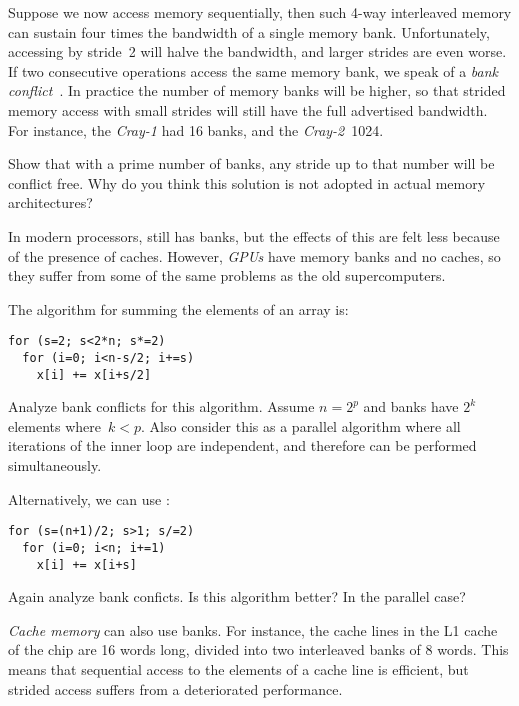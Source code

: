 Suppose we now access memory sequentially, then such 4-way interleaved
memory can sustain four times the bandwidth of a single memory
bank. Unfortunately, accessing by stride~2 will halve the bandwidth,
and larger strides are even worse.
%
If two consecutive operations
access the same memory bank, we speak of a
\emph{bank conflict}~\cite{Bailey:conflict}.
%
In practice the number of memory
banks will be higher, so that strided memory access with small strides
will still have the full advertised bandwidth. For instance, the
\emph{Cray-1} had 16 banks, and the
\emph{Cray-2}~1024.

\begin{exercise}
  Show that with a prime number of banks, any stride up to that number
  will be conflict free. Why do you think this solution is not adopted
  in actual memory architectures?
\end{exercise}

In modern processors,  still has banks, but the effects
of this are felt less because of the presence of caches. However,
\emph{GPUs}%
%
have memory banks and no caches,
so they suffer from some of the same problems as the old
supercomputers.

\begin{exercise}
  The  algorithm for summing the
  elements of an array is:
\begin{verbatim}
for (s=2; s<2*n; s*=2)
  for (i=0; i<n-s/2; i+=s)
    x[i] += x[i+s/2]
\end{verbatim}
  Analyze bank conflicts for this algorithm. Assume $n=2^p$ and banks
  have $2^k$ elements where~$k<p$. Also consider this as a parallel
  algorithm where all iterations of the inner loop are independent,
  and therefore can be performed
  simultaneously.

  Alternatively, we can use :
\begin{verbatim}
for (s=(n+1)/2; s>1; s/=2)
  for (i=0; i<n; i+=1)
    x[i] += x[i+s]
\end{verbatim}
  Again analyze bank conficts. Is this algorithm better? In the
  parallel case?
\end{exercise}

\emph{Cache memory} can also use banks. For instance, the
cache lines in the L1 cache of the  chip
are 16 words long, divided into two interleaved banks of 8 words. This
means that sequential access to the elements of a cache line is
efficient, but strided access suffers from a deteriorated performance.

